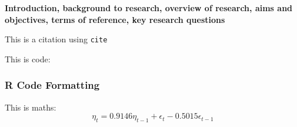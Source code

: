 \textbf{Introduction, background to research, overview of research, aims and objectives, terms of reference, key research questions}

This is a citation \cite{Tibshirani_1996} using \texttt{cite}

This is code:
\subsubsection{R Code Formatting}


This is maths:
\begin{equation}
\eta_t = 0.9146\eta_{t-1} + \epsilon_t -0.5015\epsilon_{t-1}
\end{equation}

